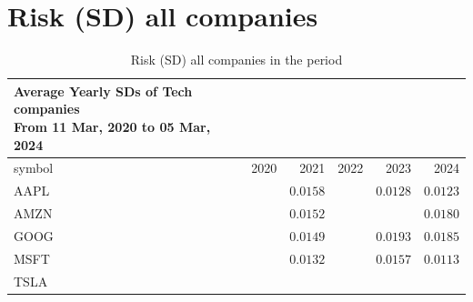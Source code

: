 \documentclass[
  12pt]{article}
\theoremstyle{definition}
\theoremstyle{remark}
\begin{document}
\section{Risk (SD) all companies}\label{risk-sd-all-companies}

\begin{longtable}{lrrrrr}

\caption{\label{tbl-risk-all-companies}Risk (SD) all companies in the
period}

\tabularnewline

\caption*{
{\large Average Yearly SDs of Tech companies} \\
{\small From 11 Mar, 2020 to 05 Mar, 2024}
} \\
\toprule
symbol & 2020 & 2021 & 2022 & 2023 & 2024 \\
\midrule\addlinespace[2.5pt]
AAPL & \cellcolor[HTML]{FF0000}{\textcolor[HTML]{FFFFFF}{$0.0283$}} & $0.0158$ & \cellcolor[HTML]{FF0000}{\textcolor[HTML]{FFFFFF}{$0.0224$}} & $0.0128$ & $0.0123$ \\
AMZN & \cellcolor[HTML]{FF0000}{\textcolor[HTML]{FFFFFF}{$0.0237$}} & $0.0152$ & \cellcolor[HTML]{FF0000}{\textcolor[HTML]{FFFFFF}{$0.0316$}} & \cellcolor[HTML]{FF0000}{\textcolor[HTML]{FFFFFF}{$0.0207$}} & $0.0180$ \\
GOOG & \cellcolor[HTML]{FF0000}{\textcolor[HTML]{FFFFFF}{$0.0234$}} & $0.0149$ & \cellcolor[HTML]{FF0000}{\textcolor[HTML]{FFFFFF}{$0.0244$}} & $0.0193$ & $0.0185$ \\
MSFT & \cellcolor[HTML]{FF0000}{\textcolor[HTML]{FFFFFF}{$0.0268$}} & $0.0132$ & \cellcolor[HTML]{FF0000}{\textcolor[HTML]{FFFFFF}{$0.0223$}} & $0.0157$ & $0.0113$ \\
TSLA & \cellcolor[HTML]{FF0000}{\textcolor[HTML]{FFFFFF}{$0.0538$}} & \cellcolor[HTML]{FF0000}{\textcolor[HTML]{FFFFFF}{$0.0342$}} & \cellcolor[HTML]{FF0000}{\textcolor[HTML]{FFFFFF}{$0.0423$}} & \cellcolor[HTML]{FF0000}{\textcolor[HTML]{FFFFFF}{$0.0340$}} & \cellcolor[HTML]{FF0000}{\textcolor[HTML]{FFFFFF}{$0.0309$}} \\
\bottomrule

\end{longtable}


  
\end{document}
